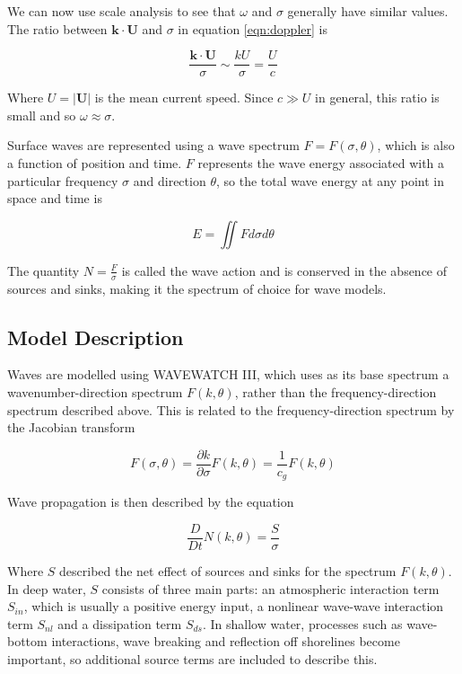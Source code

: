 We can now use scale analysis to see that $\omega$ and $\sigma$ generally have similar values. The ratio between $\mathbf{k}\cdot\mathbf{U}$ and $\sigma$ in equation \ref{eqn:doppler} is

\[
\frac{\mathbf{k}\cdot\mathbf{U}}{\sigma} \sim \frac{kU}{\sigma} = \frac U c
\]

Where $U = |\mathbf{U}|$ is the mean current speed. Since $c \gg U$ in general, this ratio is small and so $\omega \approx \sigma$.

Surface waves are represented using a wave spectrum $F = F(\sigma,\theta)$, which is also a function of position and time. $F$ represents the wave energy associated with a particular frequency $\sigma$ and direction $\theta$, so the total wave energy at any point in space and time is 

\[
E = \iint F d\sigma d\theta
\]

The quantity $N = \frac F \sigma$ is called the wave action and is conserved in the absence of sources and sinks, making it the spectrum of choice for wave models.

\subsection{Model Description}

Waves are modelled using WAVEWATCH III, which uses as its base spectrum a wavenumber-direction spectrum $F(k,\theta)$, rather than the frequency-direction spectrum described above. This is related to the frequency-direction spectrum by the Jacobian transform

\[
F(\sigma,\theta) = \frac{\partial k}{\partial \sigma}F(k,\theta) = \frac{1}{c_g}F(k,\theta)
\]

Wave propagation is then described by the equation

\begin{equation}
    \frac{D}{Dt}N(k,\theta) = \frac S \sigma
\end{equation}

Where $S$ described the net effect of sources and sinks for the spectrum $F(k,\theta)$. In deep water, $S$ consists of three main parts: an atmospheric interaction term $S_{in}$, which is usually a positive energy input, a nonlinear wave-wave interaction term $S_{nl}$ and a dissipation term $S_{ds}$. In shallow water, processes such as wave-bottom interactions, wave breaking and reflection off shorelines become important, so additional source terms are included to describe this.


